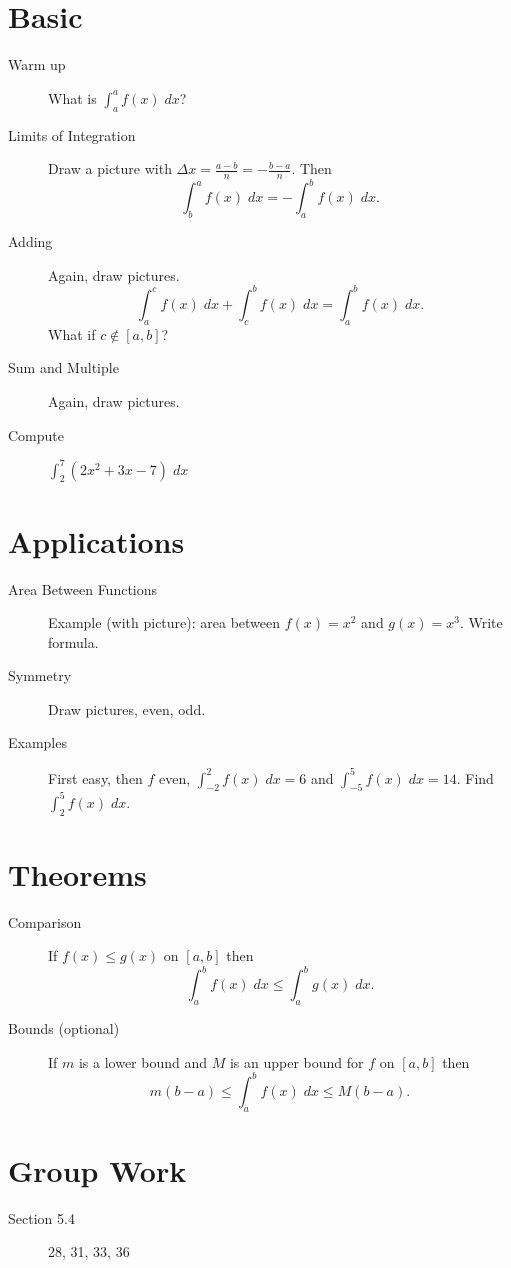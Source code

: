 \documentclass[11pt]{article}
\begin{document}
\drawtitle

\section*{Basic}
\begin{description}
\item[Warm up] What is $\int_a^a f(x)\;dx$?
\item[Limits of Integration] Draw a picture with $\Delta
  x=\frac{a-b}{n}=-\frac{b-a}{n}$.  Then
  \[
  \int_b^a f(x)\;dx = -\int_a^b f(x)\;dx.
  \]
\item[Adding]  Again, draw pictures.
  \[
  \int_a^c f(x)\;dx + \int_c^b f(x)\;dx = \int_a^b f(x)\;dx.
  \]
  What if $c\not\in [a,b]$?
\item[Sum and Multiple] Again, draw pictures.
\item[Compute] $\int_2^7 (2x^2+3x-7)\;dx$
\end{description}

\section*{Applications}
\begin{description}
\item[Area Between Functions] Example (with picture): area between
  $f(x)=x^2$ and $g(x)=x^3$.  Write formula.
\item[Symmetry] Draw pictures, even, odd.
\item[Examples] First easy, then $f$ even, $\int_{-2}^2 f(x)\;dx=6$
  and $\int_{-5}^5 f(x)\;dx=14$.  Find $\int_2^5 f(x)\;dx$.
\end{description}

\section*{Theorems}
\begin{description}
\item[Comparison] If $f(x)\leq g(x)$ on $[a,b]$ then
  \[
  \int_a^b f(x)\;dx \leq \int_a^b g(x)\;dx.
  \]
\item[Bounds (optional)] If $m$ is a lower bound and $M$ is an upper
  bound for $f$ on $[a,b]$ then
  \[
  m(b-a)\leq \int_a^b f(x)\;dx \leq M(b-a).
  \]
\end{description}


\section*{Group Work}
\begin{description}
\item[Section 5.4] 28, 31, 33, 36
\end{description}
\end{document}
